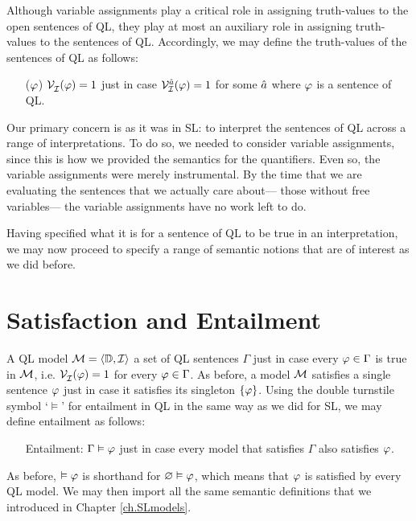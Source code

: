 Although variable assignments play a critical role in assigning truth-values to the open sentences of QL, they play at most an auxiliary role in assigning truth-values to the sentences of QL. 
Accordingly, we may define the truth-values of the sentences of QL as follows:

\begin{enumerate}[labelsep=.15in]
  \item[($\varphi$)] $\mathcal{V}_{\mathcal{I}}^{}(\varphi)=1$ just in case $\mathcal{V}_{\mathcal{I}}^{\hat{a}}(\varphi)=1$ for some $\hat{a}$ where $\varphi$ is a sentence of QL.
\end{enumerate}

Our primary concern is as it was in SL: to interpret the sentences of QL across a range of interpretations.
To do so, we needed to consider variable assignments, since this is how we provided the semantics for the quantifiers.
Even so, the variable assignments were merely instrumental.
By the time that we are evaluating the sentences that we actually care about--- those without free variables--- the variable assignments have no work left to do.

Having specified what it is for a sentence of QL to be true in an interpretation, we may now proceed to specify a range of semantic notions that are of interest as we did before.






\section{Satisfaction and Entailment}
\label{sec.Entailment}

A QL model $\mathcal{M}=\langle\mathbb{D},\mathcal{I}\rangle$  a set of QL sentences $\Gamma$ just in case every $\varphi\in\Gamma$ is true in $\mathcal{M}$, i.e. $\mathcal{V}_{\mathcal{I}}^{}(\varphi)=1$ for every $\varphi\in\Gamma$.
As before, a model $\mathcal{M}$ satisfies a single sentence $\varphi$ just in case it satisfies its singleton $\lbrace\varphi\rbrace$.
Using the double turnstile symbol `$\models$' for entailment in QL in the same way as we did for SL, we may define entailment as follows:

\begin{enumerate}[leftmargin=1.5in]
  \item[\sc Entailment:] $\Gamma\vDash\varphi$ just in case every model that satisfies $\Gamma$ also satisfies $\varphi$.
\end{enumerate}

As before, $\vDash\varphi$ is shorthand for $\varnothing\vDash\varphi$, which means that $\varphi$ is satisfied by every QL model.
We may then import all the same semantic definitions that we introduced in Chapter \ref{ch.SLmodels}.

